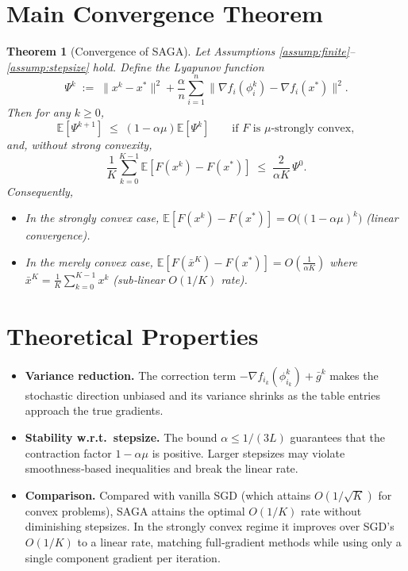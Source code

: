 \documentclass{article}
\newtheorem{theorem}{Theorem}
\newcommand{\E}{\mathbb{E}}
\newcommand{\grad}{\nabla}
\begin{document}
\section*{Main Convergence Theorem}
\begin{theorem}[Convergence of SAGA]\label{thm:conv}
Let Assumptions \ref{assump:finite}–\ref{assump:stepsize} hold. Define the Lyapunov function
\[
\Psi^{k}\;:=\;\|x^{k}-x^{*}\|^{2}+ \frac{\alpha}{n}\sum_{i=1}^{n}\|\grad f_i(\phi_i^{k})-\grad f_i(x^{*})\|^{2}.
\tag{7}
\]
Then for any $k\ge 0$,
\[
\E\!\left[\Psi^{k+1}\right]\;\le\;\left(1-\alpha\mu\right)\E\!\left[\Psi^{k}\right]\qquad\text{if $F$ is $\mu$‑strongly convex},
\tag{8}
\]
and, without strong convexity,
\[
\frac{1}{K}\sum_{k=0}^{K-1}\E\!\left[F(x^{k})-F(x^{*})\right]\;\le\;\frac{2}{\alpha K}\,\Psi^{0}.
\tag{9}
\]
Consequently,
\begin{itemize}
\item In the strongly convex case, $\E[F(x^{k})-F(x^{*})]=O\big((1-\alpha\mu)^{k}\big)$ (linear convergence).
\item In the merely convex case, $\E[F(\bar x^{K})-F(x^{*})]=O\!\left(\frac{1}{\alpha K}\right)$ where $\bar x^{K}=\frac1K\sum_{k=0}^{K-1}x^{k}$ (sub‑linear $O(1/K)$ rate).
\end{itemize}
\end{theorem}

\section*{Theoretical Properties}
\begin{itemize}
\item \textbf{Variance reduction.} The correction term $-\grad f_{i_k}(\phi_{i_k}^{k})+\bar g^{k}$ makes the stochastic direction unbiased and its variance shrinks as the table entries approach the true gradients.
\item \textbf{Stability w.r.t.\ stepsize.} The bound $\alpha\le 1/(3L)$ guarantees that the contraction factor $1-\alpha\mu$ is positive. Larger stepsizes may violate smoothness‑based inequalities and break the linear rate.
\item \textbf{Comparison.} Compared with vanilla SGD (which attains $O(1/\sqrt{K})$ for convex problems), SAGA attains the optimal $O(1/K)$ rate without diminishing stepsizes. In the strongly convex regime it improves over SGD’s $O(1/K)$ to a linear rate, matching full‑gradient methods while using only a single component gradient per iteration.
\end{itemize}
\end{document}
